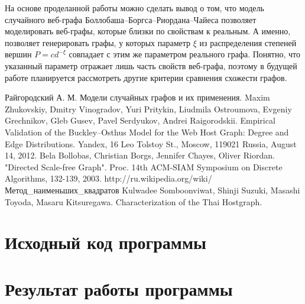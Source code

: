 \documentclass[14pt]{extreport}
\begin{document}
На основе проделанной работы можно сделать вывод о том, что модель случайного веб-графа Боллобаша--Боргса--Риордана--Чайеса позволяет моделировать веб-графы, которые близки по свойствам к реальным. А именно, позволяет генерировать графы, у которых параметр $\xi$ из распределения степеней вершин $P = c d^{-\xi}$ совпадает с этим же параметром реального графа. Понятно, что указанный параметр отражает лишь часть свойств веб-графа, поэтому в будущей работе планируется рассмотреть другие критерии сравнения схожести графов.


\begin{thebibliography}{9}
Райгородский А. М. Модели случайных графов и их применения.
Maxim Zhukovskiy, Dmitry Vinogradov, Yuri Pritykin, Liudmila Ostroumova, Evgeniy Grechnikov, Gleb Gusev, Pavel Serdyukov, Andrei Raigorodskii. Empirical Validation of the Buckley--Osthus Model for the Web Host Graph: Degree and Edge Distributions. Yandex, 16 Leo Tolstoy St., Moscow, 119021 Russia, August 14, 2012.
Bela Bollobas, Christian Borgs, Jennifer Chayes, Oliver Riordan. "Directed Scale-free Graph". Proc. 14th ACM-SIAM Symposium on Discrete Algorithms, 132-139, 2003.
http://ru.wikipedia.org/wiki/Метод\_наименьших\_квадратов
Kulwadee Somboonviwat, Shinji Suzuki, Masashi Toyoda, Masaru Kitsuregawa. Characterization of the Thai Hostgraph.
\end{thebibliography}
\newpage

\begin{appendices}
\chapter{Исходный код программы}
{\footnotesize

\newpage

\newpage

\newpage

\newpage

\newpage

\newpage

\newpage

\newpage

}

\chapter{Результат работы программы}
{\scriptsize

}
\end{appendices}
\end{document}
